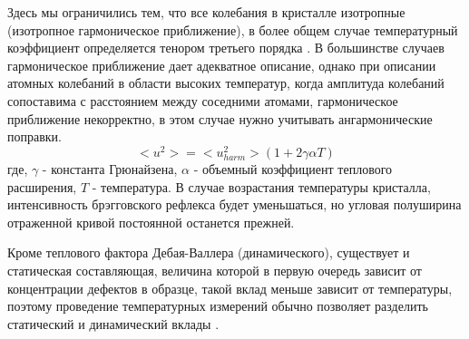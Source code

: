  Здесь мы ограничились тем, что все колебания в кристалле изотропные
 (изотропное гармоническое приближение), в более общем случае
 температурный коэффициент определяется тенором третьего порядка \cite{Willis1975}.
 В большинстве случаев гармоническое приближение дает адекватное описание, однако при описании
 атомных колебаний в области высоких температур, когда амплитуда колебаний сопоставима с расстоянием
 между соседними атомами, гармоническое приближение некорректно, в этом случае нужно учитывать ангармонические
 поправки.
 \begin{equation}
 <u^2> = <u^2_{harm}> (1+2\gamma \alpha T)
\end{equation}
\noindent
где, $\gamma$ - константа Грюнайзена, $\alpha$ - объемный коэффициент теплового расширения, $T$ - температура.
В случае возрастания температуры кристалла, интенсивность брэгговского рефлекса будет уменьшаться,
но угловая полуширина отраженной кривой постоянной останется прежней.

 Кроме теплового фактора Дебая-Валлера (динамического), существует и статическая составляющая,
 величина которой в первую очередь зависит от концентрации дефектов в образце,
 такой вклад меньше зависит от температуры, поэтому проведение температурных измерений
 обычно позволяет разделить статический и динамический вклады \cite{kibalin2015}.


%

%
